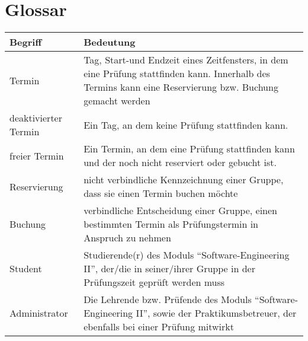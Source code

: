\section{Glossar}

\begin{tabular}{ | l | l | }
  \hline
  Begriff &
  Bedeutung \\
  \hline

  Termin &
  Tag, Start-und Endzeit eines Zeitfensters, in dem eine Prüfung
  stattfinden kann. Innerhalb des Termins kann eine Reservierung bzw.
  Buchung gemacht werden \\

  deaktivierter Termin &
  Ein Tag, an dem keine Prüfung stattfinden kann. \\

  freier Termin &
  Ein Termin, an dem eine Prüfung stattfinden kann und der noch nicht
  reserviert oder gebucht ist. \\

  Reservierung &
  nicht verbindliche Kennzeichnung einer Gruppe, dass sie einen Termin
  buchen möchte \\

  Buchung &
  verbindliche Entscheidung einer Gruppe, einen bestimmten Termin als
  Prüfungstermin in Anspruch zu nehmen \\

  Student &
  Studierende(r) des Moduls ``Software-Engineering II'', der/die in seiner/ihrer Gruppe in der Prüfungszeit geprüft werden muss \\

  Administrator &
  Die Lehrende bzw. Prüfende des Moduls ``Software-Engineering II'', sowie der Praktikumsbetreuer, der ebenfalls bei einer Prüfung mitwirkt \\
  \hline
\end{tabular}
